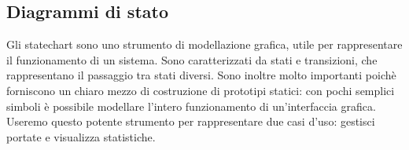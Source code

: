 \subsection{Diagrammi di stato}
    \begin{flushleft}
        Gli statechart sono uno strumento
        di modellazione grafica, utile per rappresentare il funzionamento di un
        sistema. Sono caratterizzati da stati e transizioni, che rappresentano il
        passaggio tra stati diversi. Sono inoltre molto importanti poichè forniscono
        un chiaro mezzo di costruzione di prototipi statici: con pochi semplici
        simboli è possibile modellare l'intero funzionamento di un'interfaccia grafica.
        Useremo questo potente strumento per rappresentare due casi d'uso:
        gestisci portate e visualizza statistiche.
    \end{flushleft}